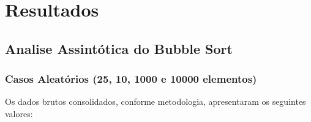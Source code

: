 \documentclass[a4paper, 12pt]{article}
\begin{document}
\vspace{0.8cm}
\section{Resultados}
\subsection{Analise Assintótica do Bubble Sort}

\subsubsection{Casos Aleatórios (25, 10, 1000 e 10000 elementos)}

Os dados brutos consolidados, conforme metodologia, apresentaram os seguintes valores:
\vspace{0.2cm}
\end{document}
